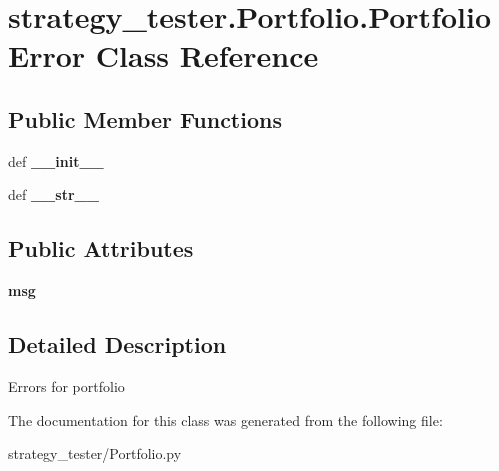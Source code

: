 \hypertarget{classstrategy__tester_1_1Portfolio_1_1PortfolioError}{\section{strategy\-\_\-tester.\-Portfolio.\-Portfolio\-Error \-Class \-Reference}
\label{classstrategy__tester_1_1Portfolio_1_1PortfolioError}
}
\subsection*{\-Public \-Member \-Functions}
\begin{DoxyCompactItemize}
\item 
\hypertarget{classstrategy__tester_1_1Portfolio_1_1PortfolioError_adc89a974299fe8ed750850e7651328e4}{def {\bfseries \-\_\-\-\_\-init\-\_\-\-\_\-}}\label{classstrategy__tester_1_1Portfolio_1_1PortfolioError_adc89a974299fe8ed750850e7651328e4}

\item 
\hypertarget{classstrategy__tester_1_1Portfolio_1_1PortfolioError_a7936b8d6e12e95ffdb8fc6b23f519e00}{def {\bfseries \-\_\-\-\_\-str\-\_\-\-\_\-}}\label{classstrategy__tester_1_1Portfolio_1_1PortfolioError_a7936b8d6e12e95ffdb8fc6b23f519e00}

\end{DoxyCompactItemize}
\subsection*{\-Public \-Attributes}
\begin{DoxyCompactItemize}
\item 
\hypertarget{classstrategy__tester_1_1Portfolio_1_1PortfolioError_ace812b0ccb00f8b2a84baad73bb4f922}{{\bfseries msg}}\label{classstrategy__tester_1_1Portfolio_1_1PortfolioError_ace812b0ccb00f8b2a84baad73bb4f922}

\end{DoxyCompactItemize}


\subsection{\-Detailed \-Description}
\begin{DoxyVerb}
Errors for portfolio
\end{DoxyVerb}
 

\-The documentation for this class was generated from the following file\-:\begin{DoxyCompactItemize}
\item 
strategy\-\_\-tester/\-Portfolio.\-py\end{DoxyCompactItemize}
